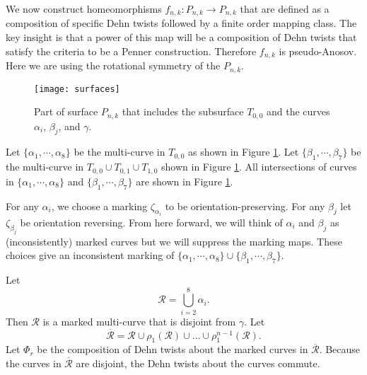  We now construct homeomorphisms $f_{n,k}: P_{n,k} \to P_{n,k}$ that are defined as a composition of specific Dehn twists
followed by a finite order mapping class. The key insight is that a power of this map will be a composition of
Dehn twists that satisfy the criteria to be a Penner construction.  Therefore $f_{n,k}$ is pseudo-Anosov. Here we are using the rotational symmetry of the $P_{n,k}$.

\begin{figure}[t]
    \centering
    \texttt{[image: surfaces]}
    \caption{Part of surface $P_{n,k}$ that includes the subsurface $T_{0,0}$ and the curves $\alpha_i$, $\beta_j$, and $\gamma$.}
    \label{fig:curves}
\end{figure}


Let $\{\alpha_1,\cdots,\alpha_8\}$ be the multi-curve in $T_{0,0}$ as shown in Figure \ref{fig:curves}.  Let $\{\beta_1,\cdots,\beta_7\}$ be the multi-curve in $T_{0,0}\cup T_{0,1}\cup T_{1,0}$ shown in Figure \ref{fig:curves}.  All intersections of curves in $\{\alpha_1,\cdots,\alpha_8\}$ and $\{\beta_1,\cdots,\beta_7\}$ are shown in Figure \ref{fig:curves}.

For any $\alpha_i$, we choose a marking $\zeta_{\alpha_i}$ to be orientation-preserving.  For any $\beta_j$ let $\zeta_{\beta_j}$ be
orientation reversing. From here forward, we will think of $\alpha_i$ and $\beta_j$ as (inconsistently) marked curves but we will suppress the marking maps. These choices give an inconsistent marking of $\{\alpha_1,\cdots,\alpha_8\}\cup\{\beta_1,\cdots,\beta_7\}$.

Let 
$$\mathcal{R}=\displaystyle\bigcup_{i=2}^8\alpha_i.$$ Then $\mathcal{R}$ is a marked multi-curve that is disjoint from $\gamma$.  Let
$$\overline{\mathcal{R}}= \mathcal{R} \cup \rho_1(\mathcal{R}) \cup \dots \cup
\rho_1^{n-1}(\mathcal{R}).$$
Let $\Phi_r$ be the composition of Dehn twists about the marked curves in $\overline{\mathcal{R}}$.  Because the curves in $\overline{\mathcal{R}}$ are disjoint, the Dehn twists about the curves commute.


